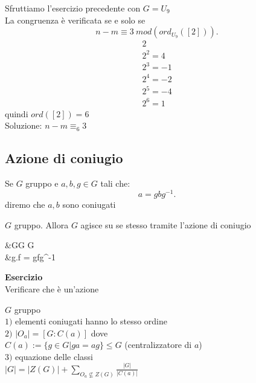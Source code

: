 \documentclass[12px]{article}
\begin{document}
    Sfruttiamo l'esercizio precedente con $G = U_9$ \\
    La congruenza è verificata se e solo se
    \[
	    n - m \equiv 3 \ mod(ord_{U_9}([2]))
    .\] 
    \begin{gather*}
    	2\\
	2^2 = 4\\
	2^3 = -1\\
	2^4 = -2\\
	2^5 = -4\\
	2^6 = 1
    \end{gather*}
    quindi $ord([2]) = 6$\\
    Soluzione: $n-m \equiv_6 3$

\subsection{Azione di coniugio}
	\begin{defi}
		Se $G$ gruppo e $a,b,g\in G$ tali che:
		 \[
			 a = gbg^{-1}
		.\] 
		diremo che $a,b$ sono coniugati
	\end{defi}
	\begin{defi}
		$G$ gruppo. Allora $G$ agisce su se stesso tramite l'azione di coniugio\\
		\begin{aligned}
			&G\times G \rightarrow G\\
			&g.f = gfg^{-1}
		\end{aligned}
	\end{defi}
	\textbf{Esercizio}\\
	Verificare che è un'azione\\
	\begin{teo}
		$G$ gruppo\\
		$1)$ elementi coniugati hanno lo stesso ordine\\
		$2)$ $|O_a| = [G:C(a)]$ dove\\
		$C(a):=\{g\in G|ga = ag\}\leq G$ (centralizzatore di  $a$)\\
		$3)$ equazione delle classi\\
		$\displaystyle|G| = |Z(G)| + \sum_{O_a\not\subseteq Z(G)}\frac{|G|}{|C(a)|}$
	\end{teo}
\end{document}
